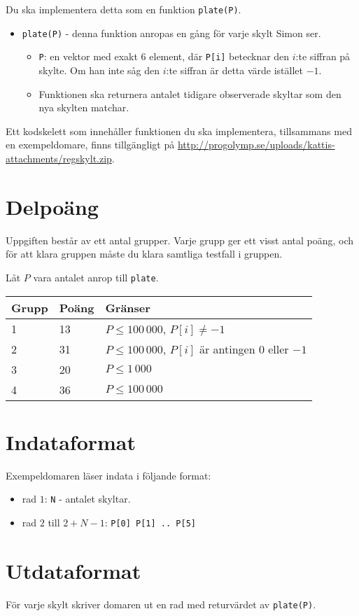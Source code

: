 Du ska implementera detta som en funktion \texttt{plate(P)}.
\begin{itemize}
  \item \texttt{plate(P)} - denna funktion anropas en gång för varje skylt Simon ser.
  \begin{itemize}
    \item \texttt{P}: en vektor med exakt 6 element, där \texttt{P[i]} betecknar den $i$:te siffran på skylte.
      Om han inte såg den $i$:te siffran är detta värde istället $-1$.
    \item Funktionen ska returnera antalet tidigare observerade skyltar som den nya skylten matchar.
  \end{itemize}
\end{itemize}

Ett kodskelett som innehåller funktionen du ska implementera, tillsammans med en exempeldomare, finns tillgängligt på
\url{http://progolymp.se/uploads/kattis-attachments/regskylt.zip}.

\section*{Delpoäng}
Uppgiften består av ett antal grupper. Varje grupp ger ett visst antal poäng, och för att klara
gruppen måste du klara samtliga testfall i gruppen.

Låt $P$ vara antalet anrop till \texttt{plate}.

\begin{tabular}{|l|l|l|}
  \hline
  \textbf{Grupp} & \textbf{Poäng} & \textbf{Gränser} \\ \hline
  1 & 13 & $P \le 100\,000$, $P[i] \not= -1$ \\ \hline
  2 & 31 & $P \le 100\,000$, $P[i]$ är antingen $0$ eller $-1$ \\ \hline
  3 & 20 & $P \le 1\,000$ \\ \hline
  4 & 36 & $P \le 100\,000$ \\ \hline
\end{tabular}


\section*{Indataformat}
Exempeldomaren läser indata i följande format:

\begin{itemize}
  \item rad $1$: \texttt{N} - antalet skyltar.
  \item rad $2$ till $2 + N - 1$: \texttt{P[0] P[1] .. P[5]}
\end{itemize}

\section*{Utdataformat}
För varje skylt skriver domaren ut en rad med returvärdet av \texttt{plate(P)}.
